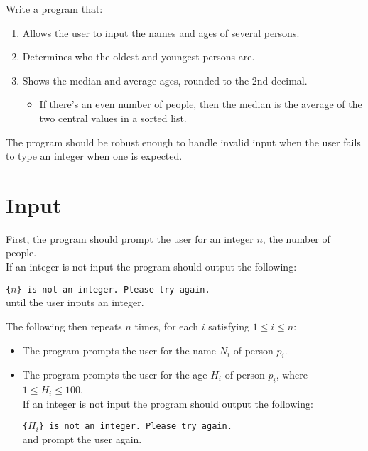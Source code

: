 
Write a program that:
\begin{enumerate}
    \item Allows the user to input the names and ages of several persons.
    \item Determines who the oldest and youngest persons are.
    \item Shows the median and average ages, rounded to the $2$nd decimal.
    \begin{itemize}
        \item
        If there's an even number of people,
        then the median is the average of the two central values in a sorted list.
    \end{itemize}
\end{enumerate}

The program should be robust enough to handle invalid input
when the user fails to type an integer when one is expected.

\section*{Input}
First, the program should prompt the user for an integer $n$, the number of people.\\
If an integer is not input the program should output the following:

\texttt{\{$n$\} is not an integer. Please try again.}\\
until the user inputs an integer.

The following then repeats $n$ times, for each $i$ satisfying $1 \le i \le n$:
\begin{itemize}
    \item The program prompts the user for the name $N_i$ of person $p_i$.

    \item
    The program prompts the user for the age $H_i$ of person $p_i$, where $1 \leq H_i \leq 100$.\\
    If an integer is not input the program should output the following:

    \texttt{\{$H_i$\} is not an integer. Please try again.}\\
    and prompt the user again.
\end{itemize}

